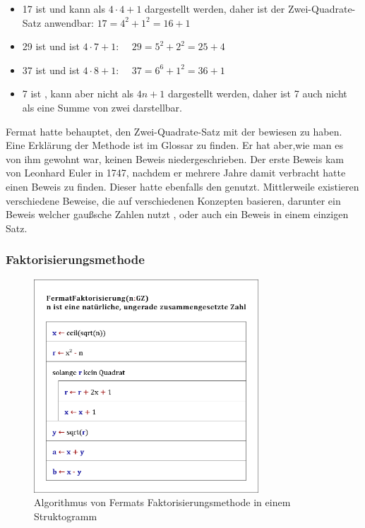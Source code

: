 \begin{itemize}
    \item 17 ist  und kann als $4 \cdot 4 + 1$ dargestellt werden, daher ist der Zwei-Quadrate-Satz anwendbar: $17 = 4^2 + 1^2 = 16 + 1$
    \item 29 ist  und ist $4 \cdot 7 + 1$: $\quad 29 = 5^2 + 2^2 = 25 + 4$
    \item 37 ist  und ist $4 \cdot 8 + 1$: $\quad 37 = 6^6 + 1^2 = 36 + 1$
    \item 7 ist , kann aber nicht als $4n + 1$ dargestellt werden, daher ist 7 auch nicht als eine Summe von zwei  darstellbar.
\end{itemize}

Fermat hatte behauptet, den Zwei-Quadrate-Satz mit der  bewiesen zu haben. Eine Erklärung der Methode ist im Glossar zu finden. Er hat aber,wie man es von ihm gewohnt war, keinen Beweis niedergeschrieben. Der erste Beweis kam von Leonhard Euler in 1747, nachdem er mehrere Jahre damit verbracht hatte einen Beweis zu finden. Dieser hatte ebenfalls den  genutzt.
Mittlerweile existieren verschiedene Beweise, die auf verschiedenen Konzepten basieren, darunter ein Beweis welcher gaußsche Zahlen nutzt \cite{woodbury}, oder auch ein Beweis in einem einzigen Satz. \cite{zagier}

\subsubsection{Faktorisierungsmethode} \label{sec:faktorMethode}

\begin{figure}[htb]
    \centering
    \includegraphics[width=0.75\textwidth]{img/factor_algorithm.png}
    \caption{Algorithmus von Fermats Faktorisierungsmethode in einem Struktogramm}
    \label{fig:factorAlgorithm}
\end{figure}

